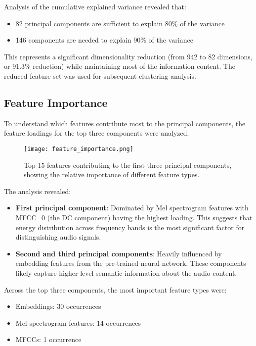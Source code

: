 \documentclass[11pt,a4paper]{article}
\begin{document}
Analysis of the cumulative explained variance revealed that:
\begin{itemize}
    \item 82 principal components are sufficient to explain 80\% of the variance
    \item 146 components are needed to explain 90\% of the variance
\end{itemize}

This represents a significant dimensionality reduction (from 942 to 82 dimensions, or 91.3\% reduction) while maintaining most of the information content. The reduced feature set was used for subsequent clustering analysis.

\subsection{Feature Importance}

To understand which features contribute most to the principal components, the feature loadings for the top three components were analyzed.

\begin{figure}[H]
    \centering
    \texttt{[image: feature\_importance.png]}
    \caption{Top 15 features contributing to the first three principal components, showing the relative importance of different feature types.}
    \label{fig:feature_importance}
\end{figure}

The analysis revealed:
\begin{itemize}
    \item \textbf{First principal component}: Dominated by Mel spectrogram features with MFCC\_0 (the DC component) having the highest loading. This suggests that energy distribution across frequency bands is the most significant factor for distinguishing audio signals.
    
    \item \textbf{Second and third principal components}: Heavily influenced by embedding features from the pre-trained neural network. These components likely capture higher-level semantic information about the audio content.
\end{itemize}

Across the top three components, the most important feature types were:
\begin{itemize}
    \item Embeddings: 30 occurrences
    \item Mel spectrogram features: 14 occurrences
    \item MFCCs: 1 occurrence
\end{itemize}
\end{document}
